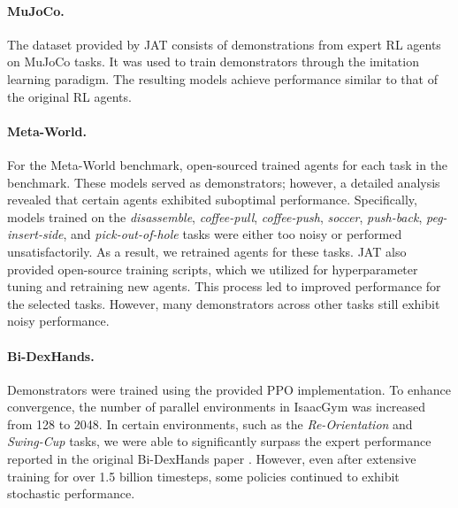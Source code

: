 \documentclass{article}
\theoremstyle{plain}
\theoremstyle{definition}
\theoremstyle{remark}
\begin{document}
\paragraph{MuJoCo.} The dataset provided by JAT \cite{gallouédec2024jacktradesmastersome} consists of demonstrations from expert RL agents on MuJoCo \cite{6386109} tasks. It was used to train demonstrators through the imitation learning paradigm. The resulting models achieve performance similar to that of the original RL agents.
\paragraph{Meta-World.} For the Meta-World \cite{yu2021metaworldbenchmarkevaluationmultitask} benchmark, \citet{gallouédec2024jacktradesmastersome} open-sourced trained agents for each task in the benchmark. These models served as demonstrators; however, a detailed analysis revealed that certain agents exhibited suboptimal performance. Specifically, models trained on the \textit{disassemble}, \textit{coffee-pull}, \textit{coffee-push}, \textit{soccer}, \textit{push-back}, \textit{peg-insert-side}, and \textit{pick-out-of-hole} tasks were either too noisy or performed unsatisfactorily. As a result, we retrained agents for these tasks.
JAT \cite{gallouédec2024jacktradesmastersome} also provided open-source training scripts, which we utilized for hyperparameter tuning and retraining new agents. This process led to improved performance for the selected tasks. However, many demonstrators across other tasks still exhibit noisy performance.
\paragraph{Bi-DexHands.} Demonstrators were trained using the provided PPO \cite{schulman2017proximalpolicyoptimizationalgorithms} implementation. To enhance convergence, the number of parallel environments in IsaacGym \cite{liang2018gpuacceleratedroboticsimulationdistributed} was increased from 128 to 2048. In certain environments, such as the \textit{Re-Orientation} and \textit{Swing-Cup} tasks, we were able to significantly surpass the expert performance reported in the original Bi-DexHands paper \cite{chen2022humanlevelbimanualdexterousmanipulation}. However, even after extensive training for over 1.5 billion timesteps, some policies continued to exhibit stochastic performance.
\end{document}

